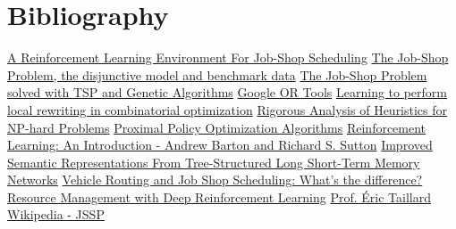 \documentclass[12pt]{article}
\begin{document}
\newpage
\section{Bibliography}
\begin{thebibliography}{10}
\href{https://arxiv.org/abs/2104.03760}{A Reinforcement Learning Environment For Job-Shop Scheduling}
\href{https://acrogenesis.com/or-tools/documentation/user_manual/manual/ls/jobshop_def_data.html}{The Job-Shop Problem, the disjunctive model and benchmark data}
\href{https://www.uaeh.edu.mx/investigacion/productos/5918/the_job_shop_scheduling_problem_solved_with_the.pdf}{The Job-Shop Problem solved with TSP and Genetic Algorithms}
\href{https://developers.google.com/optimization}{Google OR Tools}
\href{https://arxiv.org/abs/1810.00337}{Learning to perform local rewriting in combinatorial optimization}
\href{https://www.wisdom.weizmann.ac.il/~feige/Microsoft0407/japan.pdf}{Rigorous Analysis of Heuristics for NP-hard Problems}
\href{https://arxiv.org/abs/1707.06347}{Proximal Policy Optimization Algorithms}
\href{https://www.andrew.cmu.edu/course/10-703/textbook/BartoSutton.pdf}{Reinforcement Learning: An Introduction - Andrew Barton and Richard S. Sutton}
\href{https://arxiv.org/abs/1503.00075}{Improved Semantic Representations From Tree-Structured Long Short-Term Memory Networks}
\href{https://tidel.mie.utoronto.ca/pubs/icaps03.pdf}{Vehicle Routing and Job Shop Scheduling: What's the difference?}
\href{https://people.csail.mit.edu/alizadeh/papers/deeprm-hotnets16.pdf}{Resource Management with Deep Reinforcement Learning}
\href{http://mistic.heig-vd.ch/taillard/}{Prof. Éric Taillard}
\href{https://en.wikipedia.org/wiki/Job-shop_scheduling}{Wikipedia - JSSP}




\end{thebibliography}
\end{document}
